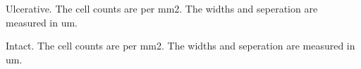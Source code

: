 \documentclass{article}
\newcommand{\pwd}{D:/DeepLearning/images_from_K/lesion_normal_comparison/report/}
\begin{document}
%
%
%
%
\begin{center}
\begin{table}[h] \centering



\caption{Ulcerative.
The cell counts are per mm2. The widths and seperation are measured in um.}
\vspace{-5pt} 
\label{tab ulcerative}

\end{table}
\end{center}%

%
%
%
%
\begin{center}
\begin{table}[h] \centering



\caption{Intact.
The cell counts are per mm2. The widths and seperation are measured in um.}
\vspace{-5pt} 
\label{tab intact}

\end{table}
\end{center}%

\clearpage%
\end{document}
